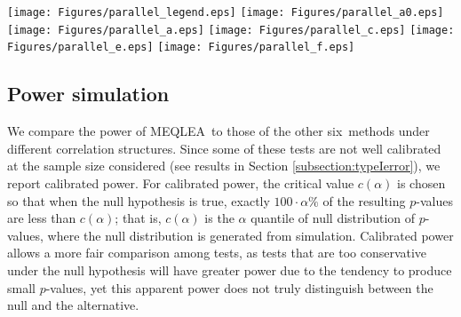 \documentclass[useAMS,usenatbib, galley]{biom}
\newcommand{\OurMethod}{MEQLEA}
\newcommand{\HowmanyTest}{six}
\newcommand{\aaCase}{a}
\newcommand{\fCase}{e}
\begin{document}
\begin{figure*}[!th]
	\begin{center}
	\texttt{[image: Figures/parallel\_legend.eps]}
	\texttt{[image: Figures/parallel\_a0.eps]}
	\texttt{[image: Figures/parallel\_a.eps]}
	\texttt{[image: Figures/parallel\_c.eps]}
	\texttt{[image: Figures/parallel\_e.eps]}
	\texttt{[image: Figures/parallel\_f.eps]}
	\end{center} 
	\caption{Uniform quantile-quantile plots for $p$-values by different methods. Each plot from top to bottom corresponds to correlation structures (\aaCase)-(\fCase), respectively. The left column is for group $A_1$ simulation, and the right column for group $A_2$ simulation (see Table \ref{table:simusetup} for detail). Results are based on 10,000 simulations.}\label{fig:typeIerror}
\end{figure*} 

	
	\subsection{Power simulation}\label{subsection:power}		 


	
	We compare the power of \OurMethod~to those of the other \HowmanyTest~methods under different correlation structures. Since some of these tests are not well calibrated at the sample size considered (see results in Section \ref{subsection:typeIerror}), we report calibrated power. For calibrated power, the critical value $c(\alpha)$ is chosen so that when the null hypothesis is true, exactly $100\cdot\alpha\%$ of the resulting $p$-values are less than $c(\alpha)$; that is, $c(\alpha)$ is  the $\alpha$ quantile of null distribution of $p$-values, where the null distribution is generated from simulation. Calibrated power allows a more fair comparison among tests, as tests that are too conservative under the null hypothesis will have greater power due to the tendency to produce small $p$-values, yet this apparent power does not truly distinguish between the null and the alternative.  
	
\end{document}
